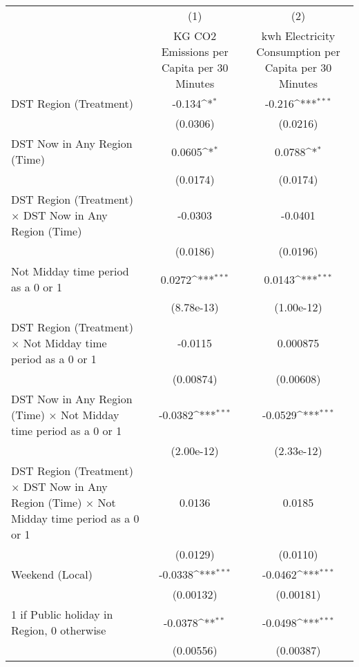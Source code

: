 {
\def\sym#1{\ifmmode^{#1}\else\(^{#1}\)\fi}
\begin{tabular}{l*{2}{c}}
\hline\hline
                    &\multicolumn{1}{c}{(1)}&\multicolumn{1}{c}{(2)}\\
                    &\multicolumn{1}{c}{KG CO2 Emissions per Capita per 30 Minutes}&\multicolumn{1}{c}{kwh Electricity Consumption per Capita per 30 Minutes}\\
\hline
DST Region (Treatment)&      -0.134\sym{*}  &      -0.216\sym{***}\\
                    &    (0.0306)         &    (0.0216)         \\
[1em]
DST Now in Any Region (Time)&      0.0605\sym{*}  &      0.0788\sym{*}  \\
                    &    (0.0174)         &    (0.0174)         \\
[1em]
DST Region (Treatment) $\times$ DST Now in Any Region (Time)&     -0.0303         &     -0.0401         \\
                    &    (0.0186)         &    (0.0196)         \\
[1em]
Not Midday time period as a 0 or 1&      0.0272\sym{***}&      0.0143\sym{***}\\
                    &  (8.78e-13)         &  (1.00e-12)         \\
[1em]
DST Region (Treatment) $\times$ Not Midday time period as a 0 or 1&     -0.0115         &    0.000875         \\
                    &   (0.00874)         &   (0.00608)         \\
[1em]
DST Now in Any Region (Time) $\times$ Not Midday time period as a 0 or 1&     -0.0382\sym{***}&     -0.0529\sym{***}\\
                    &  (2.00e-12)         &  (2.33e-12)         \\
[1em]
DST Region (Treatment) $\times$ DST Now in Any Region (Time) $\times$ Not Midday time period as a 0 or 1&      0.0136         &      0.0185         \\
                    &    (0.0129)         &    (0.0110)         \\
[1em]
Weekend (Local)     &     -0.0338\sym{***}&     -0.0462\sym{***}\\
                    &   (0.00132)         &   (0.00181)         \\
[1em]
1 if Public holiday in Region, 0 otherwise&     -0.0378\sym{**} &     -0.0498\sym{***}\\
                    &   (0.00556)         &   (0.00387)         \\

\end{tabular}}
